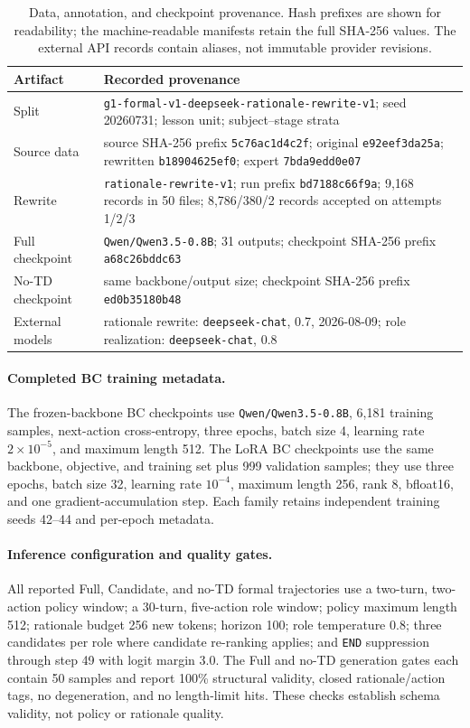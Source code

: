 \documentclass[manuscript,review,anonymous]{acmart}
\begin{document}
\begin{table}[t]
\centering
\small
\begin{tabularx}{\columnwidth}{@{}>{\raggedright\arraybackslash}p{}>{\raggedright\arraybackslash}X@{}}
\toprule
Artifact & Recorded provenance \\
\midrule
Split & \texttt{g1-formal-v1-deepseek-rationale-rewrite-v1}; seed 20260731; lesson unit; subject--stage strata \\
Source data & source SHA-256 prefix \texttt{5c76ac1d4c2f}; original \texttt{e92eef3da25a}; rewritten \texttt{b18904625ef0}; expert \texttt{7bda9edd0e07} \\
Rewrite & \texttt{rationale-rewrite-v1}; run prefix \texttt{bd7188c66f9a}; 9,168 records in 50 files; 8,786/380/2 records accepted on attempts 1/2/3 \\
Full checkpoint & \texttt{Qwen/Qwen3.5-0.8B}; 31 outputs; checkpoint SHA-256 prefix \texttt{a68c26bddc63} \\
No-TD checkpoint & same backbone/output size; checkpoint SHA-256 prefix \texttt{ed0b35180b48} \\
External models & rationale rewrite: \texttt{deepseek-chat}, 0.7, 2026-08-09; role realization: \texttt{deepseek-chat}, 0.8 \\
\bottomrule
\end{tabularx}
\caption{Data, annotation, and checkpoint provenance. Hash prefixes are shown
for readability; the machine-readable manifests retain the full SHA-256 values.
The external API records contain aliases, not immutable provider revisions.}
\label{tab:artifact-provenance}
\end{table}

\paragraph{Completed BC training metadata.}
The frozen-backbone BC checkpoints use \texttt{Qwen/Qwen3.5-0.8B}, 6,181
training samples, next-action cross-entropy, three epochs, batch size 4,
learning rate $2\times10^{-5}$, and maximum length 512. The LoRA BC checkpoints
use the same backbone, objective, and training set plus 999 validation samples;
they use three epochs, batch size 32, learning rate $10^{-4}$, maximum length
256, rank 8, bfloat16, and one gradient-accumulation step. Each family retains
independent training seeds 42--44 and per-epoch metadata.

\paragraph{Inference configuration and quality gates.}
All reported Full, Candidate, and no-TD formal trajectories use a two-turn,
two-action policy window; a 30-turn, five-action role window; policy maximum
length 512; rationale budget 256 new tokens; horizon 100; role temperature 0.8;
three candidates per role where candidate re-ranking applies; and \texttt{END}
suppression through step 49 with logit margin 3.0. The Full and no-TD
generation gates each contain 50 samples and report 100\% structural validity,
closed rationale/action tags, no degeneration, and no length-limit hits. These
checks establish schema validity, not policy or rationale quality.
\end{document}
